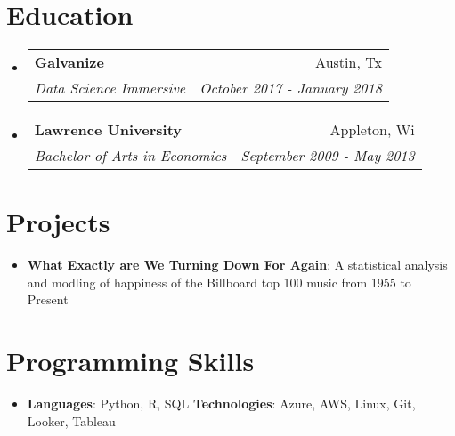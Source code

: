 \documentclass[letterpaper,11pt]{article}
\makeatletter
\newcommand{\resumeItem}[2]{
  \item\small{
    \textbf{#1}{: #2 \vspace{-2pt}}
  }
}
\newcommand{\resumeSubheading}[4]{
  \vspace{-1pt}\item
    \begin{tabular*}{0.97\textwidth}[t]{l@{\extracolsep{\fill}}r}
      \textbf{#1} & #2 \\
      \textit{\small#3} & \textit{\small #4} \\
    \end{tabular*}\vspace{-5pt}
}
\newcommand{\resumeSubItem}[2]{\resumeItem{#1}{#2}\vspace{-4pt}}
\newcommand{\resumeSubHeadingListStart}{\begin{itemize}[leftmargin=*]}
\newcommand{\resumeSubHeadingListEnd}{\end{itemize}}
\makeatother
\begin{document}
\section{Education}
  \resumeSubHeadingListStart
    \resumeSubheading
      {Galvanize}{Austin, Tx}
      {Data Science Immersive}{October 2017 - January 2018}
    \resumeSubheading
      {Lawrence University}{Appleton, Wi}
      {Bachelor of Arts in Economics}{September 2009 - May 2013}
  \resumeSubHeadingListEnd


\section{Projects}
  \resumeSubHeadingListStart
    \resumeSubItem{What Exactly are We Turning Down For Again}
      {A statistical analysis and modling of happiness of the Billboard top 100 music from 1955 to Present}
  \resumeSubHeadingListEnd


\section{Programming Skills}
  \resumeSubHeadingListStart
    \item{
      \textbf{Languages}{: Python, R, SQL}
      \hfill
      \textbf{Technologies}{: Azure, AWS, Linux, Git, Looker, Tableau}
    }
  \resumeSubHeadingListEnd


\end{document}
